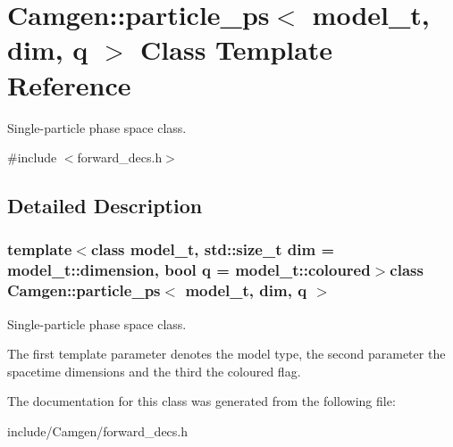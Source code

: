 \hypertarget{a00400}{\section{Camgen\-:\-:particle\-\_\-ps$<$ model\-\_\-t, dim, q $>$ Class Template Reference}
\label{a00400}
}


Single-\/particle phase space class.  




{\ttfamily \#include $<$forward\-\_\-decs.\-h$>$}



\subsection{Detailed Description}
\subsubsection*{template$<$class model\-\_\-t, std\-::size\-\_\-t dim = model\-\_\-t\-::dimension, bool q = model\-\_\-t\-::coloured$>$class Camgen\-::particle\-\_\-ps$<$ model\-\_\-t, dim, q $>$}

Single-\/particle phase space class. 

The first template parameter denotes the model type, the second parameter the spacetime dimensions and the third the coloured flag. 

The documentation for this class was generated from the following file\-:\begin{DoxyCompactItemize}
\item 
include/\-Camgen/forward\-\_\-decs.\-h\end{DoxyCompactItemize}
